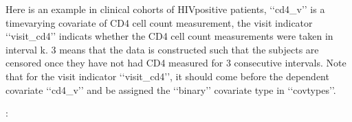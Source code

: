 \documentclass[letterpaper,10pt,english]{sphinxmanual}
\begin{document}
\sphinxAtStartPar
Here is an example in clinical cohorts of HIV\sphinxhyphen{}positive patients, ‘‘cd4\_v’’ is a time\sphinxhyphen{}varying covariate of CD4 cell count measurement,
the visit indicator ‘‘visit\_cd4’’ indicats whether the CD4 cell count measurements were taken in interval k.
3 means that the data is constructed such that the subjects are censored once they have not had CD4 measured for 3 consecutive intervals.
Note that for the visit indicator ‘‘visit\_cd4’’, it should come before the dependent covariate ‘‘cd4\_v’’ and be assigned
the ‘‘binary’’ covariate type in ‘‘covtypes’’.

\sphinxAtStartPar
{} :

\begin{sphinxVerbatim}[commandchars=\\\{\}]
 
   
   
   

  
  
  


\end{sphinxVerbatim}
\end{document}
